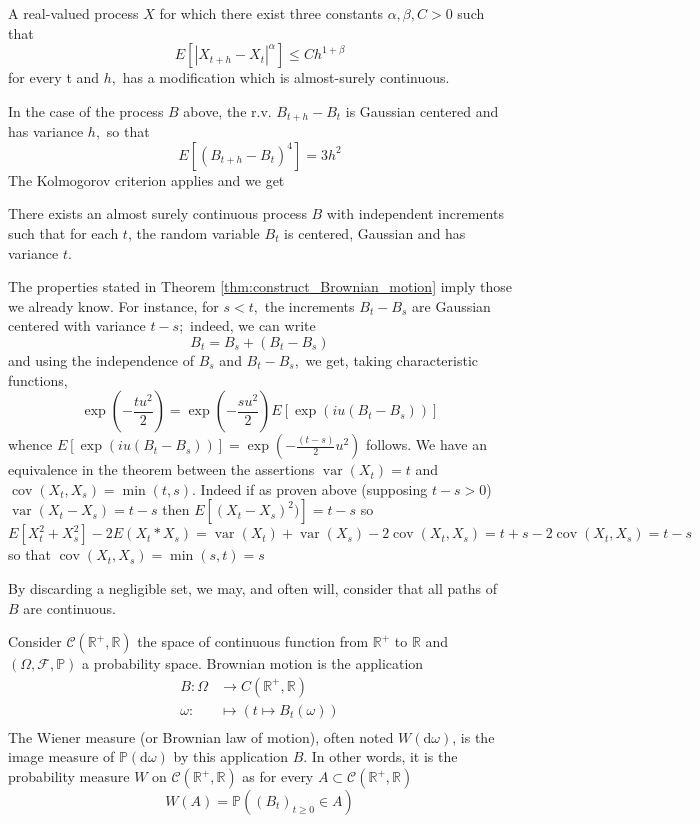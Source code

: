 \begin{theorem}
	A real-valued process $X$ for which there exist three constants $\alpha, \beta, C>0$ such that
	\[
	E\left[\left|X_{t+h}-X_{t}\right|^{\alpha}\right] \leq C h^{1+\beta}
	\]
	for every t and $h,$ has a modification which is almost-surely continuous.
\end{theorem}
In the case of the process $B$ above, the r.v. $B_{t+h}-B_{t}$ is Gaussian centered and has variance $h,$ so that
\[
E\left[\left(B_{t+h}-B_{t}\right)^{4}\right]=3 h^{2}
\]
The Kolmogorov criterion applies and we get
\begin{theorem}\label{thm:construct_Brownian_motion}
	There exists an almost surely continuous process $B$ with independent increments such that for each $t$, the random variable $B_{t}$ is centered, Gaussian and has variance $t$.
\end{theorem}
The properties stated in Theorem \eqref{thm:construct_Brownian_motion} imply those we already know. For instance, for $s<t,$ the increments $B_{t}-B_{s}$ are Gaussian centered with variance $t-s ;$ indeed, we can write
\[
B_{t}=B_{s}+\left(B_{t}-B_{s}\right)
\]
and using the independence of $B_{s}$ and $B_{t}-B_{s},$ we get, taking characteristic functions,
\[
\exp \left(-\frac{t u^{2}}{2}\right)=\exp \left(-\frac{s u^{2}}{2}\right) E\left[\exp \left(i u\left(B_{t}-B_{s}\right)\right)\right]
\]
whence $E\left[\exp \left(i u\left(B_{t}-B_{s}\right)\right)\right]=\exp \left(-\frac{(t-s)}{2} u^{2}\right)$ follows.
We have an equivalence in the theorem  between the assertions $\operatorname{var}(X_t)=t$ and $\operatorname{cov}(X_t,X_s)=\min(t,s)$. Indeed if as proven above (supposing $t-s>0$) $\operatorname{var}(X_t-X_s)=t-s$  then $E[(X_t-X_s)^2)]=t-s$ so $E[X_t^2+X_s^2]-2E(X_t*X_s)=\operatorname{var}(X_t)+\operatorname{var}(X_s)-2\operatorname{cov}(X_t,X_s)=t+s-2\operatorname{cov}(X_t,X_s)=t-s$ so that $\operatorname{cov}(X_t,X_s)=\min(s,t)=s$

By discarding a negligible set, we may, and often will, consider that all paths of $B$ are continuous.


\begin{definition}
	Consider $\mathcal{C}\left(\mathbb{R}^{+}, \mathbb{R}\right)$ the space of continuous function from  $\mathbb{R}^{+}$ to $\mathbb{R}$ and $(\Omega, \mathcal{F}, \mathbb{P})$ a probability space. Brownian motion is the application
	\begin{align*}
		B: \Omega &\rightarrow C\left(\mathbb{R}^{+}, \mathbb{R}\right)\\
		\omega : &\mapsto \left(t \mapsto B_{t}(\omega)\right)\\
	\end{align*}
The Wiener measure (or Brownian law of motion), often noted $W(\mathrm{d} \omega)$, is the image measure of $\mathbb{P}(\mathrm{d} \omega)$ by this application $B$. In other words, it is the probability measure $W$ on $\mathcal{C}\left(\mathbb{R}^{+}, \mathbb{R}\right)$ as for every
	$A \subset \mathcal{C}\left(\mathbb{R}^{+}, \mathbb{R}\right)$
	\[
	W(A)=\mathbb{P}\left(\left(B_{t}\right)_{t \geq 0} \in A\right)
	\]
\end{definition}


